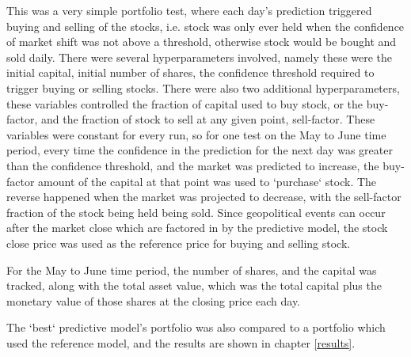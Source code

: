 This was a very simple portfolio test, where each day's prediction triggered buying and selling of the stocks, i.e. stock was only ever held when the confidence of market shift was not above a threshold, otherwise stock would be bought and sold daily. There were several hyperparameters involved, namely these were the initial capital, initial number of shares, the confidence threshold required to trigger buying or selling stocks. There were also two additional hyperparameters, these variables controlled the fraction of capital used to buy stock, or the buy-factor, and the fraction of stock to sell at any given point, sell-factor. These variables were constant for every run, so for one test on the May to June time period, every time the confidence in the prediction for the next day was greater than the confidence threshold, and the market was predicted to increase, the buy-factor amount of the capital at that point was used to `purchase` stock. The reverse happened when the market was projected to decrease, with the sell-factor fraction of the stock being held being sold. Since geopolitical events can occur after the market close which are factored in by the predictive model, the stock close price was used as the reference price for buying and selling stock. 

For the May to June time period, the number of shares, and the capital was tracked, along with the total asset value, which was the total capital plus the monetary value of those shares at the closing price each day.

The `best` predictive model's portfolio was also compared to a portfolio which used the reference model, and the results are shown in chapter \ref{results}.
